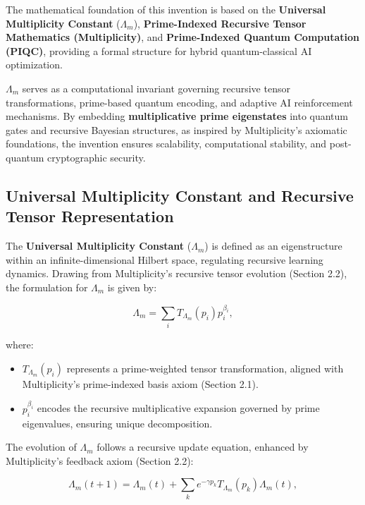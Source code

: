 \documentclass[12pt]{article}
\begin{document}
The mathematical foundation of this invention is based on the \textbf{Universal Multiplicity Constant} (\(\Lambda_m\)), \textbf{Prime-Indexed Recursive Tensor Mathematics (Multiplicity)}, and \textbf{Prime-Indexed Quantum Computation (PIQC)}, providing a formal structure for hybrid quantum-classical AI optimization.

\(\Lambda_m\) serves as a computational invariant governing recursive tensor transformations, prime-based quantum encoding, and adaptive AI reinforcement mechanisms. By embedding \textbf{multiplicative prime eigenstates} into quantum gates and recursive Bayesian structures, as inspired by Multiplicity’s axiomatic foundations, the invention ensures scalability, computational stability, and post-quantum cryptographic security.

\subsection{Universal Multiplicity Constant and Recursive Tensor Representation}

The \textbf{Universal Multiplicity Constant} (\(\Lambda_m\)) is defined as an eigenstructure within an infinite-dimensional Hilbert space, regulating recursive learning dynamics. Drawing from Multiplicity’s recursive tensor evolution (Section 2.2), the formulation for \(\Lambda_m\) is given by:

\begin{equation}
    \Lambda_m = \sum_{i} T_{\Lambda_m} (p_i) p_i^{\beta_i},
\end{equation}

where:
\begin{itemize}
    \item \(T_{\Lambda_m} (p_i)\) represents a prime-weighted tensor transformation, aligned with Multiplicity’s prime-indexed basis axiom (Section 2.1).
    \item \(p_i^{\beta_i}\) encodes the recursive multiplicative expansion governed by prime eigenvalues, ensuring unique decomposition.
\end{itemize}

The evolution of \(\Lambda_m\) follows a recursive update equation, enhanced by Multiplicity’s feedback axiom (Section 2.2):

\begin{equation}
    \Lambda_m(t+1) = \Lambda_m(t) + \sum_{k} e^{-\gamma p_k} T_{\Lambda_m} (p_k) \Lambda_m(t),
\end{equation}
\end{document}
